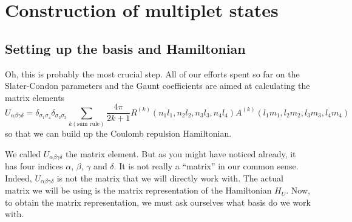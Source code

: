 \chapter{Construction of multiplet states} \label{ch:5}

\section{Setting up the basis and Hamiltonian}
Oh, this is probably the most crucial step. All of our efforts spent so far on the
Slater-Condon parameters and the Gaunt coefficients are aimed at calculating
the matrix elements
\begin{equation} \label{eq:Uelem}
U_{\alpha\beta\gamma\delta} =
\delta_{\sigma_1\sigma_4} \delta_{\sigma_2\sigma_3}
\sum_{k(\text{sum rule})} \frac{4\pi}{2k+1} R^{(k)}(n_1l_1,n_2l_2,n_3l_3,n_4l_4)
A^{(k)}(l_1m_1,l_2m_2,l_3m_3,l_4m_4)
\end{equation}
so that we can build up the Coulomb repulsion Hamiltonian.

We called $U_{\alpha\beta\gamma\delta}$ the matrix element.
But as you might have noticed already, it has four indices
$\alpha$, $\beta$, $\gamma$ and $\delta$. It is not really a ``matrix'' in our
common sense. Indeed, $U_{\alpha\beta\gamma\delta}$ is not the matrix that we will
directly work with. The actual matrix we will be using is the 
matrix representation of the Hamiltonian $H_U$. Now, to obtain the matrix
representation, we must ask ourselves what basis do we work with.

